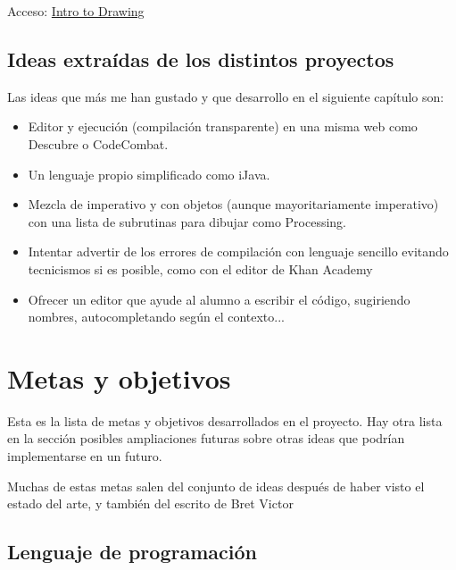 \documentclass{report}
\begin{document}
	\hfill
	
	Acceso: 
	\href{https://es.khanacademy.org/computing/hour-of-code/hour-of-code-tutorial/p/intro-to-drawing}{Intro to Drawing}
	
	\section{Ideas extraídas de los distintos proyectos}
	
	Las ideas que más me han gustado y que desarrollo en el siguiente capítulo son:
	
	\begin{itemize}
		\item Editor y ejecución (compilación transparente) en una misma web como Descubre o CodeCombat.
		\item Un lenguaje propio simplificado como iJava. 
		\item Mezcla de imperativo y con objetos (aunque mayoritariamente imperativo) con una lista de subrutinas para dibujar como Processing.
		\item Intentar advertir de los errores de compilación con lenguaje sencillo evitando tecnicismos si es posible, como con el editor de Khan Academy
		\item Ofrecer un editor que ayude al alumno a escribir el código, sugiriendo nombres, autocompletando según el contexto...
	\end{itemize}
	
	
	\chapter{Metas y objetivos}
	
	Esta es la lista de metas y objetivos desarrollados en el proyecto. Hay otra lista en la sección posibles ampliaciones futuras sobre otras ideas que podrían implementarse en un futuro.
	
	\hfill
	
	Muchas de estas metas salen del conjunto de ideas después de haber visto el estado del arte, y también del escrito de Bret Victor\cite{bretvictor}
	
	\section{Lenguaje de programación}
	
\end{document}
